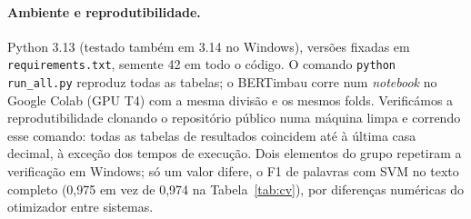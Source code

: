 

\paragraph{Ambiente e reprodutibilidade.}
Python 3.13 (testado também em 3.14 no Windows), versões fixadas em \texttt{requirements.txt},
semente 42 em todo o código. O comando \texttt{python run\_all.py} reproduz todas as tabelas;
o BERTimbau corre num \emph{notebook} no Google Colab (GPU T4) com a mesma divisão e os mesmos folds. Verificámos a reprodutibilidade clonando o repositório
público numa máquina limpa e correndo esse comando: todas as tabelas de resultados coincidem até
à última casa decimal, à exceção dos tempos de execução. Dois elementos do grupo repetiram a
verificação em Windows; só um valor difere, o F1 de palavras com SVM no texto completo
(0,975 em vez de 0,974 na Tabela~\ref{tab:cv}), por diferenças numéricas do otimizador entre sistemas.
